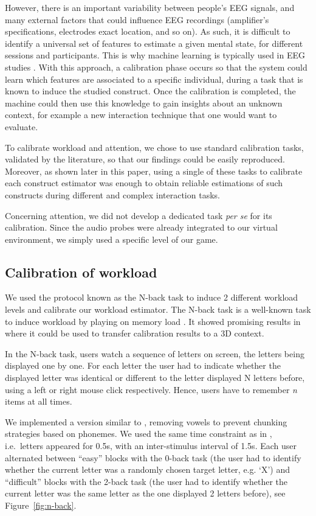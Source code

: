 \documentclass[]{sigchi}
\begin{document}
However, there is an important variability between people's EEG signals,
and many external factors that could influence EEG recordings
(amplifier's specifications, electrodes exact location, and so on). As
such, it is difficult to identify a universal set of features to
estimate a given mental state, for different sessions and participants.
This is why machine learning is typically used in EEG studies
\citep{Blankertz2010}. With this approach, a calibration phase occurs so
that the system could learn which features are associated to a specific
individual, during a task that is known to induce the studied construct.
Once the calibration is completed, the machine could then use this
knowledge to gain insights about an unknown context, for example a new
interaction technique that one would want to evaluate.

To calibrate workload and attention, we chose to use standard
calibration tasks, validated by the literature, so that our findings
could be easily reproduced. Moreover, as shown later in this paper,
using a single of these tasks to calibrate each construct estimator was
enough to obtain reliable estimations of such constructs during
different and complex interaction tasks.

Concerning attention, we did not develop a dedicated task \emph{per se}
for its calibration. Since the audio probes were already integrated to
our virtual environment, we simply used a specific level of our game.

\subsection{Calibration of workload}\label{calibration-of-workload}

We used the protocol known as the N-back task to induce 2 different
workload levels and calibrate our workload estimator. The N-back task is
a well-known task to induce workload by playing on memory load
\citep{Owen2005}. It showed promising results in \citep{Wobrock2015}
where it could be used to transfer calibration results to a 3D context.

In the N-back task, users watch a sequence of letters on screen, the
letters being displayed one by one. For each letter the user had to
indicate whether the displayed letter was identical or different to the
letter displayed N letters before, using a left or right mouse click
respectively. Hence, users have to remember \emph{n} items at all times.

We implemented a version similar to \citep{Grimes2008}, removing vowels
to prevent chunking strategies based on phonemes. We used the same time
constraint as in \citep{Wobrock2015}, i.e.~letters appeared for 0.5s,
with an inter-stimulus interval of 1.5s. Each user alternated between
``easy'' blocks with the 0-back task (the user had to identify whether
the current letter was a randomly chosen target letter, e.g. `X') and
``difficult'' blocks with the 2-back task (the user had to identify
whether the current letter was the same letter as the one displayed 2
letters before), see Figure~\ref{fig:n-back}.
\end{document}
